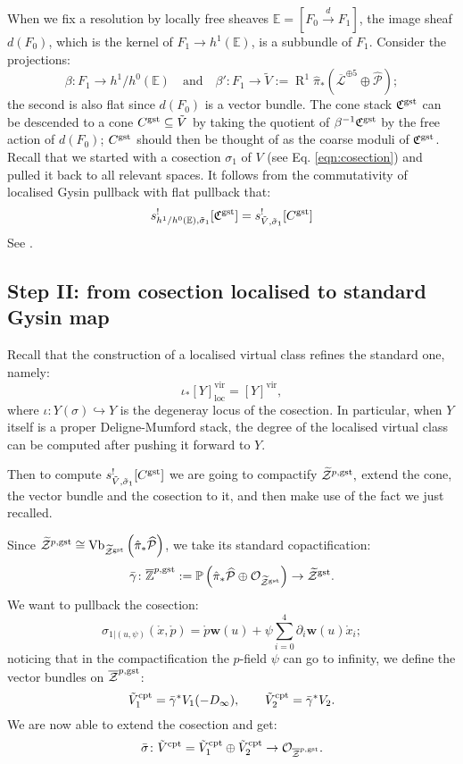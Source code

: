 \documentclass[11pt]{amsart}
\newcommand{\pazocal}{\mathcal}
\newcommand{\tZ}{\widetilde{\pazocal Z}}
\newcommand{\oZp}{\overline{\mathcal Z}^{p,\rm{gst}}}
\newcommand{\PP}{\mathbb P}
\newcommand{\Z}{\mathbb{Z}}
\newcommand{\OO}{\mathcal{O}}
\renewcommand{\to}{\rightarrow}
\newcommand{\virt}[1]{[#1]^{\mathrm{vir}}}
\newcommand{\virloc}[1]{[#1]^{\mathrm{vir}}_{\mathrm{loc}}}
\newcommand{\hL}{\overline{\mathcal{L}}}
\newcommand{\w}{\mathbf{w}}
\theoremstyle{definition}
\theoremstyle{definition}
\begin{document}
When we fix a resolution by locally free sheaves $\mathbb E=[F_0\xrightarrow{d} F_1]$, the image sheaf $d(F_0)$, which is the kernel of $F_1\to h^1(\mathbb E)$, is a subbundle of $F_1$. Consider the projections:
\[
 \beta\colon F_1\to h^1/h^0(\mathbb E) \quad \text{and} \quad \beta'\colon F_1\to \tilde{V}:=\operatorname{R}^1\hat{\pi}_*(\hL^{\oplus 5}\oplus\widehat{\mathcal P});
\]
the second is also flat since $d(F_0)$ is a vector bundle. The cone stack $\mathfrak C^{\rm{gst}}$ can be descended to a cone $C^{\rm{gst}}\subseteq \tilde{V}$ by taking the quotient of $\beta^{-1}\mathfrak C^{\rm{gst}}$ by the free action of $d(F_0)$; $C^{\rm{gst}}$ should then be thought of as the coarse moduli of $\mathfrak C^{\rm{gst}}$. Recall that we started with a cosection $\sigma_1$ of $V$ (see Eq. \eqref{eqn:cosection}) and pulled it back to all relevant spaces. 
It follows from the commutativity of localised Gysin pullback with flat pullback that:
\[
 s^!_{h^1/h^0(\mathbb E),\tilde\sigma_1}[\mathfrak C^{\rm{gst}}]= s^!_{\tilde V,\tilde\sigma_1}[C^{\rm{gst}}]
\]
See \cite[Proposition 6.3]{CLpfields}.



\subsection*{Step II: from cosection localised to standard Gysin map}
Recall that the construction of a localised virtual class refines the standard one, namely:
\[\iota_*\virloc{Y}=\virt{Y},\]
where $\iota\colon Y(\sigma)\hookrightarrow Y$ is the degeneray locus of the cosection. In particular, when $Y$ itself is a proper Deligne-Mumford stack, the degree of the localised virtual class can be computed after pushing it forward to $Y$.

Then to compute $s^!_{\tilde V,\tilde\sigma_1}[C^{\rm{gst}}]$ we are going to compactify $\tZ^{p,\rm{gst}},$ extend the cone, the vector bundle and the cosection to it, and then make use of the fact we just recalled.

Since $\tZ^{p,\rm{gst}}\cong\operatorname{Vb}_{\tZ^{\rm{gst}}}\left(\hat{\pi}_*\widehat{\mathcal P}\right)$, we take its standard copactification:
\[\bar{\gamma}\colon \overline{\Z}^{p,\rm{gst}}:=\PP\left(\hat{\pi}_*\widehat{\mathcal P}\oplus \OO_{\tZ^{\rm{gst}}}\right)\to \tZ^{\rm{gst}}.\]
We want to pullback the cosection:
\[\sigma_{1|(u,\psi)}(\mathring{x},\mathring{p})=\mathring{p}\w(u)+\psi\sum_{i=0}^4\partial_i\w(u)\mathring{x}_i;\]
noticing that in the compactification the $p$-field $\psi$ can go to infinity, we define the vector bundles on $\oZp$:
\[\tilde{V}^{\rm{cpt}}_1=\bar{\gamma}^*V_1(-D_{\infty}),\qquad \tilde{V}^{\rm{cpt}}_2=\bar{\gamma}^*V_2.\]
We are now able to extend the cosection and get:
\[\bar{\sigma}\colon \tilde{V}^{\rm{cpt}}=\tilde{V}^{\rm{cpt}}_1\oplus \tilde{V}^{\rm{cpt}}_2\to\OO_{\oZp}. \]
 
\end{document}
